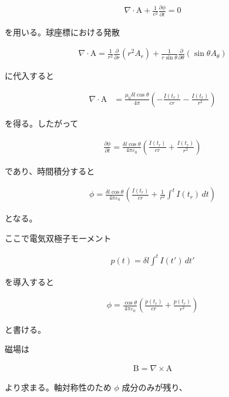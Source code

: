 \documentclass[platex,dvipdfmx,a4paper]{jsarticle}
\newcommand{\hb}[2]{\frac{\partial #1}{\partial #2}}
\newcommand{\vect}[1]{\boldsymbol{\mathrm{#1}}}
\begin{document}
\begin{align*}
  \nabla\cdot\vect{A}
  +
  \frac{1}{c^2}
  \hb{\phi}{t}
  =
  0
\end{align*}

を用いる。球座標における発散

\begin{align*}
  \nabla\cdot\vect{A}
  =
  \frac{1}{r^2}
  \hb{}{r}\!\left(r^2A_r\right)
  +
  \frac{1}{r\sin\theta}
  \hb{}{\theta}\!\left(\sin\theta A_\theta\right)
\end{align*}

に代入すると

\begin{align*}
  \nabla\cdot\vect{A}
  &=
  \frac{\mu_0\delta l\cos\theta}{4\pi}
  \left(
    -\frac{\dot I(t_r)}{cr}
    -\frac{I(t_r)}{r^2}
  \right)
\end{align*}

を得る。したがって

\begin{align*}
  \hb{\phi}{t}
  =
  \frac{\delta l\cos\theta}{4\pi\varepsilon_0}
  \left(
    \frac{\dot I(t_r)}{cr}
    +
    \frac{I(t_r)}{r^2}
  \right)
\end{align*}

であり、時間積分すると

\begin{align*}
  \phi
  =
  \frac{\delta l\cos\theta}{4\pi\varepsilon_0}
  \left(
    \frac{I(t_r)}{cr}
    +
    \frac{1}{r^2}
    \int^t I(t_r)\,dt
  \right)
\end{align*}

となる。

ここで電気双極子モーメント

\begin{align*}
  p(t)
  =
  \delta l
  \int^t I(t')\,dt'
\end{align*}

を導入すると

\begin{align*}
  \phi
  =
  \frac{\cos\theta}{4\pi\varepsilon_0}
  \left(
    \frac{\dot p(t_r)}{cr}
    +
    \frac{p(t_r)}{r^2}
  \right)
\end{align*}

と書ける。

磁場は

\begin{align*}
  \vect{B}
  =
  \nabla\times\vect{A}
\end{align*}

より求まる。軸対称性のため \(\phi\) 成分のみが残り、
\end{document}
